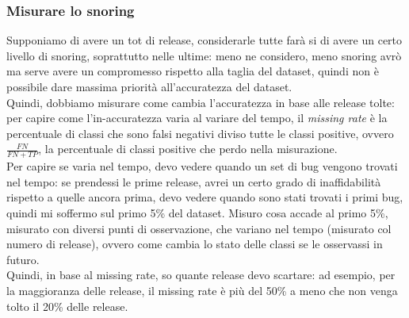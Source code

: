\documentclass{article}
\begin{document}
\subsubsection{Misurare lo snoring}
Supponiamo di avere un tot di release, considerarle tutte farà si di avere un certo livello di snoring, soprattutto nelle ultime: meno ne considero, meno snoring avrò ma serve avere un compromesso rispetto alla taglia del dataset, quindi non è possibile dare massima priorità all'accuratezza del dataset.\\ Quindi, dobbiamo misurare come cambia l'accuratezza in base alle release tolte: per capire come l'in-accuratezza varia al variare del tempo, il \textit{missing rate} è la percentuale di classi che sono falsi negativi diviso tutte le classi positive, ovvero $\frac{FN}{FN + TP}$, la percentuale di classi positive che perdo nella misurazione.\\ Per capire se varia nel tempo, devo vedere quando un set di bug vengono trovati nel tempo: se prendessi le prime release, avrei un certo grado di inaffidabilità rispetto a quelle ancora prima, devo vedere quando sono stati trovati i primi bug, quindi mi soffermo sul primo 5\% del dataset. Misuro cosa accade al primo 5\%, misurato con diversi punti di osservazione, che variano nel tempo (misurato col numero di release), ovvero come cambia lo stato delle classi se le osservassi in futuro.\\ Quindi, in base al missing rate, so quante release devo scartare: ad esempio, per la  maggioranza delle release, il missing rate è più del 50\% a meno che non venga tolto il 20\% delle release.
\end{document}
